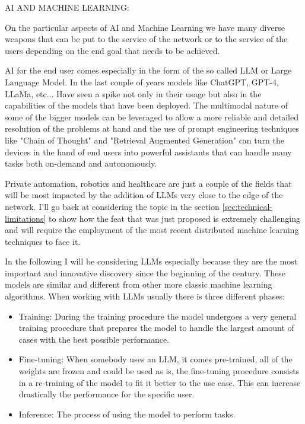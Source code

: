 \bigskip
\noindent
AI AND MACHINE LEARNING:
\label{ssec:ai-ml}

On the particular aspects of AI and Machine Learning we have many diverse weapons that can be put to
the service of the network or to the service of the users depending on the end goal that needs to
be achieved.

AI for the end user comes especially in the form of the so called LLM or Large Language Model. In
the last couple of years models like ChatGPT, GPT-4, LLaMa, etc... Have seen a spike not only in
their usage but also in the capabilities of the models that have been deployed. The multimodal
nature of some of the bigger models can be leveraged to allow a more reliable and detailed
resolution of the problems at hand and the use of prompt engineering techniques like "Chain of
Thought" and "Retrieval Augmented Generation" can turn the devices in the hand of end users into
powerful assistants that can handle many tasks both on-demand and autonomously.

Private automation, robotics and healthcare are just a couple of the fields that will be most
impacted by the addition of LLMs very close to the edge of the network. I'll go back at considering
the topic in the section \ref{sec:technical-limitations} to show how the feat that was just proposed
is extremely challenging and will require the employment of the most recent distributed machine
learning techniques to face it.

In the following I will be considering LLMs especially because they are the most important and
innovative discovery since the beginning of the century. These models are similar and different from
other more classic machine learning algorithms. When working with LLMs usually there is three
different phases:
\begin{itemize}
	\item Training: During the training procedure the model undergoes a very general training
		procedure that prepares the model to handle the largest amount of cases with the
		best possible performance.
	\item Fine-tuning: When somebody uses an LLM, it comes pre-trained, all of the weights are
		frozen and could be used as is, the fine-tuning procedure consists in a re-training
		of the model to fit it better to the use case. This can increase drastically the
		performance for the specific user.
	\item Inference: The process of using the model to perform tasks.
\end{itemize}


